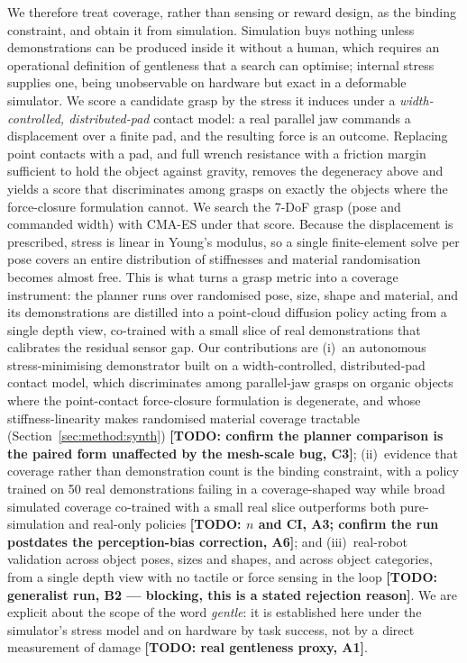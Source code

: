 We therefore treat coverage, rather than sensing or reward design, as the binding constraint,
and obtain it from simulation. Simulation buys nothing unless demonstrations can be produced
inside it without a human, which requires an operational definition of gentleness that a
search can optimise; internal stress supplies one, being unobservable on hardware but exact in
a deformable simulator. We score a candidate grasp by the stress it induces under a
\emph{width-controlled, distributed-pad} contact model: a real parallel jaw commands a
displacement over a finite pad, and the resulting force is an outcome. Replacing point
contacts with a pad, and full wrench resistance with a friction margin sufficient to hold the
object against gravity, removes the degeneracy above and yields a score that discriminates
among grasps on exactly the objects where the force-closure formulation cannot. We search the
7-DoF grasp (pose and commanded width) with CMA-ES under that score. Because the
displacement is prescribed, stress is linear in Young's modulus, so a single finite-element
solve per pose covers an entire distribution of stiffnesses and material randomisation becomes
almost free. This is what turns a grasp metric into a coverage instrument: the planner runs
over randomised pose, size, shape and material, and its demonstrations are distilled into a
point-cloud diffusion policy acting from a single depth view, co-trained with a small slice of
real demonstrations that calibrates the residual sensor gap. Our contributions are
(i)~an autonomous stress-minimising demonstrator built on a width-controlled, distributed-pad
contact model, which discriminates among parallel-jaw grasps on organic objects where the
point-contact force-closure formulation is degenerate, and whose stiffness-linearity makes
randomised material coverage tractable (Section~\ref{sec:method:synth})
\textbf{[TODO: confirm the planner comparison is the paired form unaffected by the mesh-scale
bug, C3]}; (ii)~evidence that coverage rather than demonstration count is the binding
constraint, with a policy trained on 50 real demonstrations failing in a coverage-shaped way
while broad simulated coverage co-trained with a small real slice outperforms both
pure-simulation and real-only policies \textbf{[TODO: $n$ and CI, A3; confirm the run
postdates the perception-bias correction, A6]}; and (iii)~real-robot validation across object
poses, sizes and shapes, and across object categories, from a single depth view with no
tactile or force sensing in the loop \textbf{[TODO: generalist run, B2 --- blocking, this is a
stated rejection reason]}. We are explicit about the scope of the word
\emph{gentle}: it is established here under the simulator's stress model and on hardware by
task success, not by a direct measurement of damage \textbf{[TODO: real gentleness proxy, A1]}.
